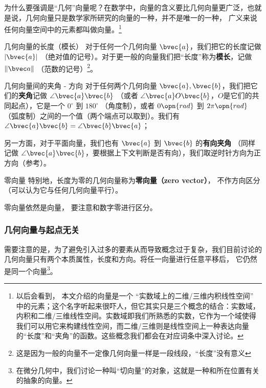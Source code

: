 为什么要强调是“几何”向量呢？在数学中，向量的含义要比几何向量更广泛，也就是说，几何向量只是数学家所研究的向量的一种，并不是唯一的一种， 广义来说任何向量空间中的元素都叫做向量。\footnote{以后会看到， 本文介绍的向量是一个 “实数域上的二维/三维内积线性空间” 中的元素；这个名字听起来很吓人，但它其实只是三个概念的结合：实数域，内积和二维/三维线性空间。实数域即我们所熟悉的实数，它作为一个域使得我们可以用它来构建线性空间，而二维/三维则是线性空间上一种表达向量的“长度”和“夹角”的函数。这些概念我们都会在对应词条中深入讨论。}

\begin{definition}{几何向量的长度（模长）}
对于任何一个几何向量 $\bvec{a}$，我们把它的长度记做 $|\bvec{a}|$ （绝对值的记号）。对于更一般的向量我们把“长度”称为\textbf{模长}，记做 $\|\bvec a\|$ （范数的记号）\footnote{这是因为一般的向量不一定像几何向量一样是一段线段，“长度”没有意义}。
\end{definition}


\begin{definition}{几何向量间的夹角 - 方向}
对于任何两个几何向量 $\bvec{a}, \bvec{b}$，我们把它们的\textbf{夹角}记做 $\angle \bvec{a} \bvec{b}$ （或者 $\angle \bvec{a} O \bvec{b}$，$O$是它们的共同起点），它是一个 $0^{\circ}$ 到 $180^{\circ}$ （角度制），或者 $0 \opn{rad}$ 到 $2 \pi \opn{rad}$ （弧度制）之间的一个值（两个端点可以取到）。我们有 $\angle \bvec{a} \bvec{b} = \angle \bvec{b} \bvec{a}$；

另一方面，对于平面向量，我们也有 $\bvec{a}$ 到 $\bvec{b}$ 的\textbf{有向夹角} （同样记做 $\angle \bvec{a} \bvec{b}$，要根据上下文判断是否有向），我们取逆时针方向为正方向（参考）。
\end{definition}



\begin{definition}{零向量}
特别地，长度为零的几何向量称为\textbf{零向量（zero vector）}， 不作方向区分（可以认为它与任何几何向量平行）。
\end{definition}
零向量依然是向量， 要注意和数字零进行区分。

\subsubsection{几何向量与起点无关}
需要注意的是，为了避免引入过多的要素从而导致概念过于复杂，我们目前讨论的几何向量只有两个本质属性，长度和方向。将任一向量进行任意平移后， 它仍然是同一个向量\footnote{在微分几何中，我们讨论一种叫“切向量”的对象，这就是一种和所在位置有关的抽象的向量。}。

